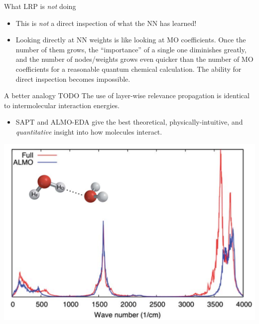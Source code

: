 \documentclass[xetex,compress]{beamer}
\begin{document}
\begin{frame}{What LRP is \protect\emph{not} doing}
  \begin{itemize}
    \item This is \emph{not} a direct inspection of what the NN has learned!
    \item Looking directly at NN weights is like looking at MO coefficients. Once the number of them grows, the ``importance'' of a single one diminishes greatly, and the number of nodes/weights grows even quicker than the number of MO coefficients for a reasonable quantum chemical calculation. The ability for direct inspection becomes impossible.
  \end{itemize}
\end{frame}


\begin{frame}{A better analogy}
  TODO
  The use of layer-wise relevance propagation is identical to intermolecular interaction energies.
  \begin{itemize}
  \item SAPT and ALMO-EDA give the best theoretical, physically-intuitive, and \emph{quantitative} insight into how molecules interact.
  \end{itemize}
\end{frame}

\begin{frame}{}
  \begin{center}
    \includegraphics[scale=0.50]{./figures/almo_water_combined.pdf}
  \end{center}
\end{frame}
\end{document}
